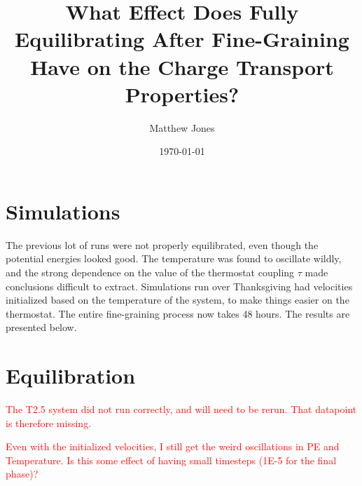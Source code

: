 \documentclass[12pt]{article}
\title{What Effect Does Fully Equilibrating After Fine-Graining Have on the Charge Transport Properties?}
\author{Matthew Jones}
\date{\today}
\begin{document}
\maketitle

\section{Simulations}

The previous lot of runs were not properly equilibrated, even though the potential energies looked good.
The temperature was found to oscillate wildly, and the strong dependence on the value of the thermostat coupling $\tau$ made conclusions difficult to extract.
Simulations run over Thanksgiving had velocities initialized based on the temperature of the system, to make things easier on the thermostat.
The entire fine-graining process now takes 48 hours.
The results are presented below.


\section{Equilibration}


\textcolor{red}{The T2.5 system did not run correctly, and will need to be rerun. That datapoint is therefore missing.}


\textcolor{red}{Even with the initialized velocities, I still get the weird oscillations in PE and Temperature. Is this some effect of having small timesteps (1E-5 for the final phase)?}
\end{document}
